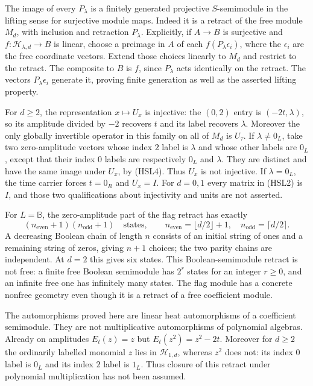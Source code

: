 The image of every $P_\lambda$ is a finitely generated projective
$S$-semimodule in the lifting sense for surjective module maps.
Indeed it is a retract of the free module $M_d$, with inclusion
and retraction $P_\lambda$. Explicitly, if $A\to B$ is surjective
and $f:\mathcal H_{\lambda,d}\to B$ is linear, choose a preimage
in $A$ of each $f(P_\lambda\epsilon_i)$, where the $\epsilon_i$
are the free coordinate vectors. Extend those choices linearly
to $M_d$ and restrict to the retract. The composite to $B$ is
$f$, since $P_\lambda$ acts identically on the retract. The
vectors $P_\lambda\epsilon_i$ generate it, proving finite
generation as well as the asserted lifting property.

For $d\ge2$, the representation $x\mapsto U_x$ is injective:
the $(0,2)$ entry is $(-2t,\lambda)$, so its amplitude divided
by $-2$ recovers $t$ and its label recovers $\lambda$.
Moreover the only globally invertible operator in this family
on all of $M_d$ is $U_\tau$.
If $\lambda\ne0_L$, take two zero-amplitude vectors whose
index $2$ label is $\lambda$ and whose other labels are $0_L$,
except that their index $0$ labels are respectively $0_L$
and $\lambda$. They are distinct and have the same image under
$U_x$, by (HSL4). Thus $U_x$ is not injective. If $\lambda=0_L$,
the time carrier forces $t=0_R$ and $U_x=I$.
For $d=0,1$ every matrix in (HSL2) is $I$, and those two
qualifications about injectivity and units are not asserted.

For $L=\mathbb B$, the zero-amplitude part of the flag retract
has exactly
\begin{equation}\tag{HSL11}
 (n_{\mathrm{even}}+1)(n_{\mathrm{odd}}+1)
 \quad\text{states},\qquad
 n_{\mathrm{even}}=\lfloor d/2\rfloor+1,\quad
 n_{\mathrm{odd}}=\lceil d/2\rceil .
\end{equation}
A decreasing Boolean chain of length $n$ consists of an initial
string of ones and a remaining string of zeros, giving $n+1$
choices; the two parity chains are independent. At $d=2$ this
gives six states. This Boolean-semimodule retract is not free:
a finite free Boolean semimodule has $2^r$ states for an integer
$r\ge0$, and an infinite free one has infinitely many states.
The flag module has a concrete nonfree geometry even though it
is a retract of a free coefficient module.

The automorphisms proved here are linear heat automorphisms of
a coefficient semimodule. They are not multiplicative
automorphisms of polynomial algebras. Already on amplitudes
$E_t(z)=z$ but $E_t(z^2)=z^2-2t$. Moreover for $d\ge2$ the
ordinarily labelled monomial $z$ lies in $\mathcal H_{1,d}$,
whereas $z^2$ does not: its index $0$ label is $0_L$ and its
index $2$ label is $1_L$. Thus closure of this retract under
polynomial multiplication has not been assumed.

